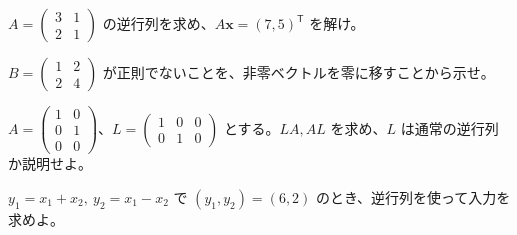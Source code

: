 \documentclass[11pt]{article}
\begin{document}

\problem[逆行列と復元]
$A=\begin{pmatrix}3&1\\2&1\end{pmatrix}$ の逆行列を求め、$A\boldsymbol x=(7,5)^{\mathsf T}$ を解け。
\workspace{38mm}

\problem[正則でない変換]
$B=\begin{pmatrix}1&2\\2&4\end{pmatrix}$ が正則でないことを、非零ベクトルを零に移すことから示せ。
\workspace{38mm}
\newpage

\problem[片側逆]
$A=\begin{pmatrix}1&0\\0&1\\0&0\end{pmatrix}$、$L=\begin{pmatrix}1&0&0\\0&1&0\end{pmatrix}$ とする。$LA,AL$ を求め、$L$ は通常の逆行列か説明せよ。
\workspace{38mm}

\problem[センサ校正]
$y_1=x_1+x_2,\ y_2=x_1-x_2$ で $(y_1,y_2)=(6,2)$ のとき、逆行列を使って入力を求めよ。
\workspace{38mm}
\end{document}
